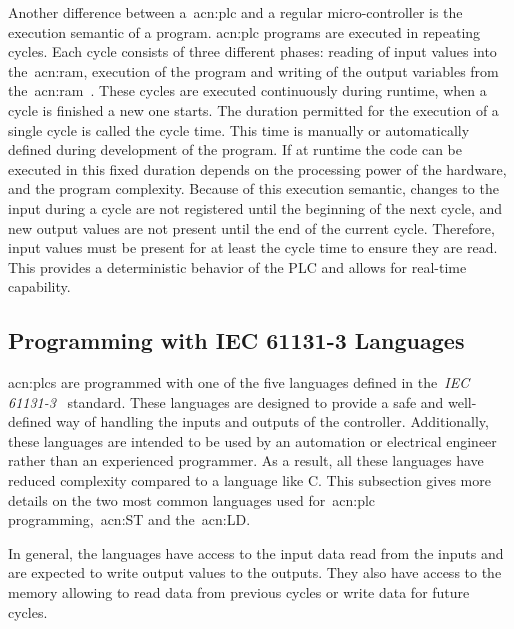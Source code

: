 Another difference between a~\acrshort{acn:plc} and a regular micro-controller is the execution semantic of a program.
\acrshort{acn:plc} programs are executed in repeating cycles.
Each cycle consists of three different phases: reading of input values into the~\acrshort{acn:ram}, execution of the program and writing of the output variables from the~\acrshort{acn:ram}~\cite[p.~75]{BOLTON200653}.
These cycles are executed continuously during runtime, when a cycle is finished a new one starts.
The duration permitted for the execution of a single cycle is called the cycle time.
This time is manually or automatically defined  during development of the program.
If at runtime the code can be executed in this fixed duration depends on the processing power of the hardware, and the program complexity.
Because of this execution semantic, changes to the input during a cycle are not registered until the beginning of the next cycle, and new output values are not present until the end of the current cycle.
Therefore, input values must be present for at least the cycle time to ensure they are read.
This provides a deterministic behavior of the PLC and allows for real-time capability.

\subsection{Programming with IEC 61131-3 Languages}

\acrshort{acn:plc}s are programmed with one of the five languages defined in the~\textit{IEC 61131-3}~\cite{Plcopen:61131-3} standard.
These languages are designed to provide a safe and well-defined way of handling the inputs and outputs of the controller.
Additionally, these languages are intended to be used by an automation or electrical engineer rather than an experienced programmer.
As a result, all these languages have reduced complexity compared to a language like C.
This subsection gives more details on the two most common languages used for~\acrshort{acn:plc} programming,~\acrfull{acn:ST} and the~\acrfull{acn:LD}.

In general, the languages have access to the input data read from the inputs and are expected to write output values to the outputs.
They also have access to the memory allowing to read data from previous cycles or write data for future cycles.
\\
